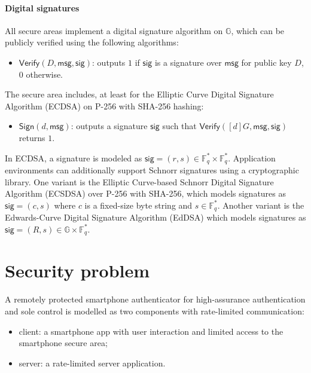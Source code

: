 \documentclass[a4paper]{article}
\begin{document}
\paragraph{Digital signatures}

All secure areas implement a digital signature algorithm on $\mathbb{G}$, which can be publicly verified using the following algorithms:
\begin{itemize}
\item $\mathsf{Verify}(D,\mathsf{msg},\mathsf{sig})$: outputs $1$ if $\mathsf{sig}$ is a signature over $\mathsf{msg}$ for public key $D$, $0$ otherwise.
\end{itemize}
The secure area includes, at least for the Elliptic Curve Digital Signature Algorithm (ECDSA) \cite{TR-03111} on P-256 with SHA-256 hashing:
\begin{itemize}
\item $\mathsf{Sign}(d,\mathsf{msg})$: outputs a signature $\mathsf{sig}$ such that $\mathsf{Verify}([d]G,\mathsf{msg},\mathsf{sig})$ returns $1$.
\end{itemize}
In ECDSA, a signature is modeled as $\mathsf{sig}=(r,s)\in\mathbb{F}^*_q\times\mathbb{F}^*_q$. Application environments can additionally support Schnorr signatures using a cryptographic library. One variant is the Elliptic Curve-based Schnorr Digital Signature Algorithm (ECSDSA) \cite{TR-03111} over P-256 with SHA-256, which models signatures as $\mathsf{sig}=(c,s)$ where $c$ is a fixed-size byte string and $s\in\mathbb{F}^*_q$. Another variant is the Edwards-Curve Digital Signature Algorithm (EdDSA) \cite{rfc8032} which models signatures as $\mathsf{sig}=(R,s)\in\mathbb{G}\times\mathbb{F}^*_q$.

\section{Security problem}

A remotely protected smartphone authenticator for high-assurance authentication and sole control is modelled as two components with rate-limited communication:
\begin{itemize}
\item client: a smartphone app with user interaction and limited access to the smartphone secure area;
\item server: a rate-limited server application.
\end{itemize}
\end{document}
